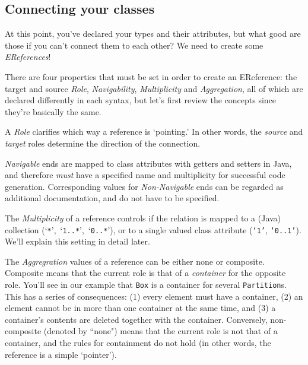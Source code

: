 \newpage
\subsection{Connecting your classes}
\genHeader
\hypertarget{static:references splash}{}

At this point, you've declared your types and their attributes, but what good are those if you can't connect them to each other? We need to create some
\emph{EReferences}!

There are four properties that must be set in order to create an EReference: the target and source \emph{Role}, \emph{Navigability}, \emph{Multiplicity} and \emph{Aggregation}, all of which are declared differently in each syntax, but let's first review the concepts since they're basically the same.

A \emph{Role} clarifies which way a reference is `pointing.' In other words, the \emph{source} and \emph{target} roles determine the direction of the
connection.

\emph{Navigable} ends are mapped to class attributes with getters and setters in Java, and therefore \emph{must} have a specified name and
multiplicity for successful code generation. Corresponding values for \emph{Non-Navigable} ends can  be regarded as additional documentation, and do not have
to be specified.

The \emph{Multiplicity} of a reference controls if the relation is mapped to a (Java) collection (`\texttt{*}',~`\texttt{1..*}',~`\texttt{0..*}'), or to a single
valued class attribute (\texttt{`1'}, \texttt{`0..1'}). We'll explain this setting in detail later.

The \emph{Aggregration} values of a reference can be either none or com\-po\-site. Composite means that the current role is that of a
\emph{container} for the opposite role. You'll see in our example that \texttt{Box} is a container for several \texttt{Partition}s.
This has a series of consequences: (1) every element must have a container, (2) an element cannot be in more than one container at the same time, and (3) a
container's contents are deleted together with the container. Conversely, non-composite (denoted by ``none") means that the current role is not that of a container,
and the rules for containment do not hold (in other words, the reference is a simple `pointer').



